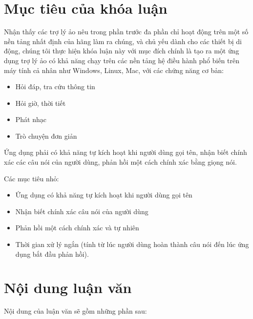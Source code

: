 \section{Mục tiêu của khóa luận}

Nhận thấy các trợ lý ảo nêu trong phần trước đa phần chỉ hoạt động trên một số nền tảng nhất định của hãng làm ra chúng, và chủ yếu dành cho các thiết bị di động, chúng tôi thực hiện khóa luận này với mục đích chính là tạo ra một ứng dụng trợ lý ảo có khả năng chạy trên các nền tảng hệ điều hành phổ biến trên máy tính cả nhân như Windows, Linux, Mac, với các chứng năng cơ bản:

\begin{itemize}
    \item Hỏi đáp, tra cứu thông tin
    \item Hỏi giờ, thời tiết
    \item Phát nhạc
    \item Trò chuyện đơn giản
\end{itemize}

Ứng dụng phải có khả năng tự kích hoạt khi người dùng gọi tên, nhận biết chính xác các câu nói của người dùng, phản hồi một cách chính xác bằng giọng nói.

Các mục tiêu nhỏ:

\begin{itemize}
    \item Ứng dụng có khả năng tự kích hoạt khi người dùng gọi tên
    \item Nhận biết chính xác câu nói của người dùng
    \item Phản hồi một cách chính xác và tự nhiên
    \item Thời gian xử lý ngắn (tính từ lúc người dùng hoàn thành câu nói đến lúc ứng dụng bắt đầu phản hồi).
\end{itemize}

\section{Nội dung luận văn}

Nội dung của luận văn sẽ gồm những phần sau:

